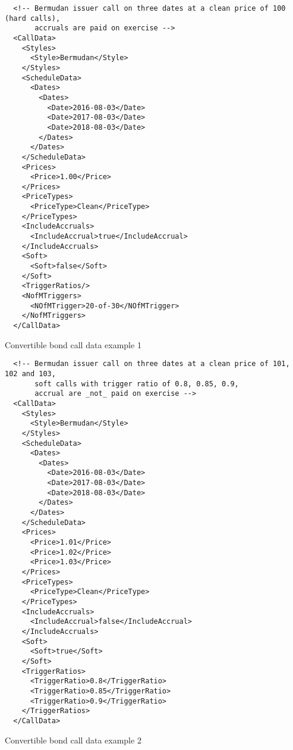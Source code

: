 \begin{listing}[H]
\begin{verbatim}
  <!-- Bermudan issuer call on three dates at a clean price of 100 (hard calls),
       accruals are paid on exercise -->
  <CallData>
    <Styles>
      <Style>Bermudan</Style>
    </Styles>
    <ScheduleData>
      <Dates>
        <Dates>
          <Date>2016-08-03</Date>
          <Date>2017-08-03</Date>
          <Date>2018-08-03</Date>
        </Dates>
      </Dates>
    </ScheduleData>
    <Prices>
      <Price>1.00</Price>
    </Prices>
    <PriceTypes>
      <PriceType>Clean</PriceType>
    </PriceTypes>
    <IncludeAccruals>
      <IncludeAccrual>true</IncludeAccrual>
    </IncludeAccruals>
    <Soft>
      <Soft>false</Soft>
    </Soft>
    <TriggerRatios/>
    <NofMTriggers>
      <NOfMTrigger>20-of-30</NOfMTrigger>
    </NofMTriggers>
  </CallData>
\end{verbatim}
\caption{Convertible bond call data example 1}
\label{lst:convertiblebonddata_callputdata_1}
\end{listing}

\begin{listing}[H]
\begin{verbatim}
  <!-- Bermudan issuer call on three dates at a clean price of 101, 102 and 103,
       soft calls with trigger ratio of 0.8, 0.85, 0.9,
       accrual are _not_ paid on exercise -->
  <CallData>
    <Styles>
      <Style>Bermudan</Style>
    </Styles>
    <ScheduleData>
      <Dates>
        <Dates>
          <Date>2016-08-03</Date>
          <Date>2017-08-03</Date>
          <Date>2018-08-03</Date>
        </Dates>
      </Dates>
    </ScheduleData>
    <Prices>
      <Price>1.01</Price>
      <Price>1.02</Price>
      <Price>1.03</Price>
    </Prices>
    <PriceTypes>
      <PriceType>Clean</PriceType>
    </PriceTypes>
    <IncludeAccruals>
      <IncludeAccrual>false</IncludeAccrual>
    </IncludeAccruals>
    <Soft>
      <Soft>true</Soft>
    </Soft>
    <TriggerRatios>
      <TriggerRatio>0.8</TriggerRatio>
      <TriggerRatio>0.85</TriggerRatio>
      <TriggerRatio>0.9</TriggerRatio>
    </TriggerRatios>
  </CallData>
\end{verbatim}
\caption{Convertible bond call data example 2}
\label{lst:convertiblebonddata_callputdata_2}
\end{listing}

